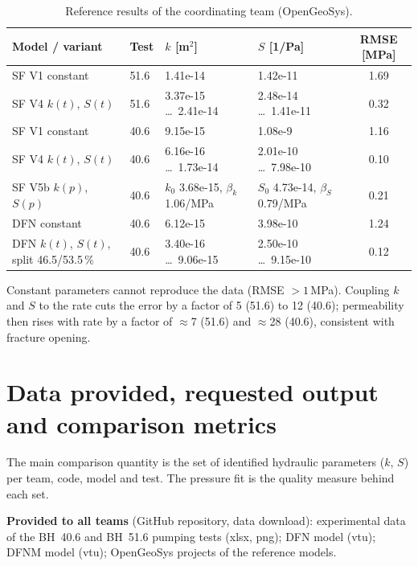 \documentclass[11pt,a4paper]{article}
\begin{document}
\begin{table}[H]
  \centering
  \caption{Reference results of the coordinating team (OpenGeoSys).}
  \label{tab:ref}
  \footnotesize\setlength{\tabcolsep}{4pt}
  \begin{tabular}{llllc}
    \toprule
    Model / variant & Test & $k$ [m$^2$] & $S$ [1/Pa] & RMSE [MPa] \\
    \midrule
    SF V1 constant & 51.6 & 1.41e-14 & 1.42e-11 & 1.69 \\
    SF V4 $k(t)$, $S(t)$ & 51.6 & 3.37e-15 \ldots\ 2.41e-14 & 2.48e-14 \ldots\ 1.41e-11 & 0.32 \\
    SF V1 constant & 40.6 & 9.15e-15 & 1.08e-9 & 1.16 \\
    SF V4 $k(t)$, $S(t)$ & 40.6 & 6.16e-16 \ldots\ 1.73e-14 & 2.01e-10 \ldots\ 7.98e-10 & 0.10 \\
    SF V5b $k(p)$, $S(p)$ & 40.6 & $k_0$ 3.68e-15, $\beta_k$ 1.06/MPa & $S_0$ 4.73e-14, $\beta_S$ 0.79/MPa & 0.21 \\
    DFN constant & 40.6 & 6.12e-15 & 3.98e-10 & 1.24 \\
    DFN $k(t)$, $S(t)$, split 46.5/53.5\,\% & 40.6 & 3.40e-16 \ldots\ 9.06e-15 & 2.50e-10 \ldots\ 9.15e-10 & 0.12 \\
    \bottomrule
  \end{tabular}
\end{table}

Constant parameters cannot reproduce the data (RMSE $>1$\,MPa). Coupling $k$ and $S$ to the rate cuts the error by a factor of 5 (51.6) to 12 (40.6); permeability then rises with rate by a factor of $\approx$7 (51.6) and $\approx$28 (40.6), consistent with fracture opening.

\section{Data provided, requested output and comparison metrics}

The main comparison quantity is the set of identified hydraulic parameters ($k$, $S$) per team, code, model and test. The pressure fit is the quality measure behind each set.

\textbf{Provided to all teams} (GitHub repository, data download): experimental data of the BH~40.6 and BH~51.6 pumping tests (xlsx, png); DFN model (vtu); DFNM model (vtu); OpenGeoSys projects of the reference models.
\end{document}

